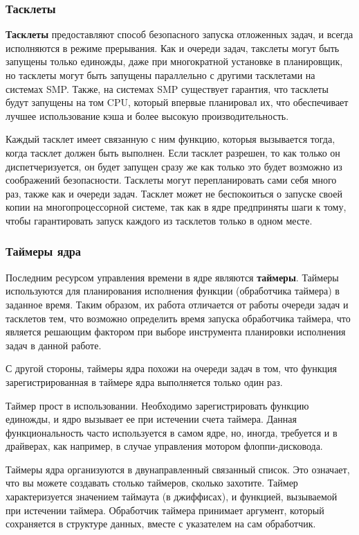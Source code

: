 \documentclass[a4paper,14pt]{extarticle}
\begin{document}
 	\subsubsection{Тасклеты}
 	
 	{\bf Тасклеты} предоставляют способ безопасного запуска отложенных задач, и всегда исполняются в режиме прерывания. Как и очереди задач, такслеты могут быть запущены только единожды, даже при многократной установке в планировщик, но тасклеты могут быть запущены параллельно с другими тасклетами на системах SMP. Также, на системах SMP существует гарантия, что тасклеты будут запущены на том CPU, который впервые планировал их,
 	что обеспечивает лучшее использование кэша и более высокую производительность.
 	
 	Каждый тасклет имеет связанную с ним функцию, которыя вызывается тогда, когда тасклет должен быть выполнен. Если тасклет разрешен, то как только он диспетчеризуется, он будет запущен сразу же как только это будет возможно из
 	соображений безопасности. Тасклеты могут перепланировать сами себя много раз, также как и очереди задач. Тасклет может не беспокоиться о запуске своей копии на многопроцессорной системе, так как в ядре предприняты шаги к тому, чтобы
 	гарантировать запуск каждого из тасклетов только в одном месте.
 	
 	\subsubsection{Таймеры ядра}
 	
 	Последним ресурсом управления времени в ядре являются {\bf таймеры}. Таймеры используются для планирования исполнения функции (обработчика таймера) в заданное время. Таким образом, их работа отличается от работы очереди задач и тасклетов тем, что возможно определить время запуска обработчика таймера, что является решающим фактором при выборе инструмента планировки исполнения задач в данной работе. 
 	
 	С другой стороны, таймеры ядра похожи на очереди задач в том,
 	что функция зарегистрированная в таймере ядра выполняется только один раз.
 	
 	\newpage
 	
 	Таймер прост в использовании. Необходимо зарегистрировать функцию единожды, и ядро вызывает ее при истечении счета таймера. Данная функциональность часто используется в самом ядре, но, иногда, требуется и в драйверах, как например, в случае управления мотором флоппи-дисковода.
 	
 	Таймеры ядра организуются в двунаправленный связанный список. Это означает, что вы можете создавать столько таймеров, сколько захотите. Таймер характеризуется значением таймаута (в джиффисах), и функцией, вызываемой при истечении таймера. Обработчик таймера принимает аргумент, который сохраняется в структуре данных, вместе с указателем на сам обработчик.
 	
\end{document}
